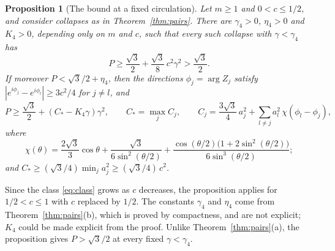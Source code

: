 \documentclass[11pt]{article}
\newtheorem{proposition}{Proposition}
\theoremstyle{definition}
\begin{document}
\begin{proposition}[The bound at a fixed circulation]\label{prop:pairsbound}
Let $m \ge 1$ and $0 < c \le 1/2$, and consider collapses as in Theorem~\ref{thm:pairs}. There are $\gamma_4 > 0$, $\eta_4 > 0$ and $K_4 > 0$, depending only on $m$ and $c$, such that every such collapse with $\gamma < \gamma_4$ has
\begin{equation}\label{eq:fixedbound}
  P \ge \frac{\sqrt{3}}{2} + \frac{\sqrt{3}}{8}\,c^2\gamma^2 > \frac{\sqrt{3}}{2}.
\end{equation}
If moreover $P < \sqrt{3}/2 + \eta_4$, then the directions $\phi_j = \arg Z_j$ satisfy $|e^{i\phi_j} - e^{i\phi_l}| \ge 3c^2/4$ for $j \ne l$, and
\begin{equation}\label{eq:sharpbound}
  P \ge \frac{\sqrt{3}}{2} + (C_* - K_4\gamma)\gamma^2, \qquad C_* = \max_j C_j, \qquad C_j = \frac{3\sqrt{3}}{4}\,a_j^2 + \sum_{l \ne j} a_l^2\,\chi(\phi_l - \phi_j),
\end{equation}
where
\begin{equation}\label{eq:chi}
  \chi(\theta) = \frac{2\sqrt{3}}{3}\cos\theta + \frac{\sqrt{3}}{6\sin^2(\theta/2)} + \frac{\cos(\theta/2)\bigl(1 + 2\sin^2(\theta/2)\bigr)}{6\sin^3(\theta/2)};
\end{equation}
and $C_* \ge (\sqrt{3}/4)\min_j a_j^2 \ge (\sqrt{3}/4)\,c^2$.
\end{proposition}

Since the class \eqref{eq:class} grows as $c$ decreases, the proposition applies for $1/2 < c \le 1$ with $c$ replaced by $1/2$. The constants $\gamma_4$ and $\eta_4$ come from Theorem~\ref{thm:pairs}(b), which is proved by compactness, and are not explicit; $K_4$ could be made explicit from the proof. Unlike Theorem~\ref{thm:pairs}(a), the proposition gives $P > \sqrt{3}/2$ at every fixed $\gamma < \gamma_4$.
\end{document}
